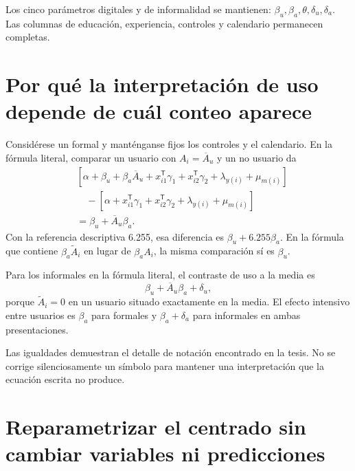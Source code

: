 \documentclass[11pt,a4paper]{article}
\begin{document}
Los cinco parámetros digitales y de informalidad se mantienen: $\beta_u,\beta_a,\theta,\delta_u,\delta_a$. Las columnas de educación, experiencia, controles y calendario permanecen completas.

\clearpage
\section{Por qué la interpretación de uso depende de cuál conteo aparece}

Considérese un formal y manténganse fijos los controles y el calendario. En la fórmula literal, comparar un usuario con $A_i=\overline A_u$ y un no usuario da
\[
\begin{aligned}
&[\alpha+\beta_u+\beta_a\overline A_u+x_{i1}^{\mathsf T}\gamma_1
+x_{i2}^{\mathsf T}\gamma_2+\lambda_{y(i)}+\mu_{m(i)}]\\
&\quad-[\alpha+x_{i1}^{\mathsf T}\gamma_1
+x_{i2}^{\mathsf T}\gamma_2+\lambda_{y(i)}+\mu_{m(i)}]\\
&=\beta_u+\overline A_u\beta_a.
\end{aligned}
\]
Con la referencia descriptiva 6.255, esa diferencia es $\beta_u+6.255\beta_a$. En la fórmula que contiene $\beta_a\widetilde A_i$ en lugar de $\beta_aA_i$, la misma comparación sí es $\beta_u$.

Para los informales en la fórmula literal, el contraste de uso a la media es
\[
\beta_u+\overline A_u\beta_a+\delta_u,
\]
porque $\widetilde A_i=0$ en un usuario situado exactamente en la media. El efecto intensivo entre usuarios es $\beta_a$ para formales y $\beta_a+\delta_a$ para informales en ambas presentaciones.

Las igualdades demuestran el detalle de notación encontrado en la tesis. No se corrige silenciosamente un símbolo para mantener una interpretación que la ecuación escrita no produce.

\clearpage
\section{Reparametrizar el centrado sin cambiar variables ni predicciones}
\end{document}
